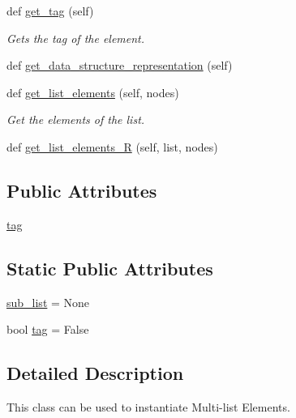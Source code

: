 \begin{DoxyCompactItemize}
def \mbox{\hyperlink{class_bridges_1_1ml__element_1_1_m_lelement_a4657bdb7c765e5c0dac5e14fb6a61153}{get\+\_\+tag}} (self)
\begin{DoxyCompactList}\small\item\em Gets the tag of the element. \end{DoxyCompactList}\item 
def \mbox{\hyperlink{class_bridges_1_1ml__element_1_1_m_lelement_a3a511e7ec143ddc3a0ee5394dac76a0d}{get\+\_\+data\+\_\+structure\+\_\+representation}} (self)
\item 
def \mbox{\hyperlink{class_bridges_1_1ml__element_1_1_m_lelement_a6919e148ee1e2cf867f30240bf890ee7}{get\+\_\+list\+\_\+elements}} (self, nodes)
\begin{DoxyCompactList}\small\item\em Get the elements of the list. \end{DoxyCompactList}\item 
def \mbox{\hyperlink{class_bridges_1_1ml__element_1_1_m_lelement_a0bceedd612ad350144d1bc2cd0634291}{get\+\_\+list\+\_\+elements\+\_\+R}} (self, list, nodes)
\end{DoxyCompactItemize}
\subsection*{Public Attributes}
\begin{DoxyCompactItemize}
\item 
\mbox{\hyperlink{class_bridges_1_1ml__element_1_1_m_lelement_aa9891ba8d6172b9ed65981f26036c213}{tag}}
\end{DoxyCompactItemize}
\subsection*{Static Public Attributes}
\begin{DoxyCompactItemize}
\item 
\mbox{\hyperlink{class_bridges_1_1ml__element_1_1_m_lelement_a08b50da0d31100920122df7df01c8abc}{sub\+\_\+list}} = None
\item 
bool \mbox{\hyperlink{class_bridges_1_1ml__element_1_1_m_lelement_a8d60a763a1a76b899f7b954a604f778f}{tag}} = False
\end{DoxyCompactItemize}


\subsection{Detailed Description}
This class can be used to instantiate Multi-\/list Elements. 

